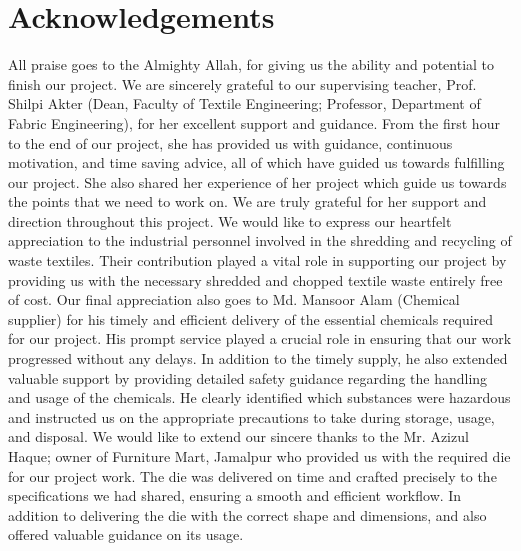 \section*{Acknowledgements}
All praise goes to the Almighty Allah, for giving us the ability and potential to finish 
our project. We are sincerely grateful to our supervising teacher, Prof. Shilpi Akter (Dean, Faculty of Textile Engineering; Professor, Department of Fabric Engineering), for her excellent support and guidance. From the first hour to the end of our project, she has provided us with guidance, continuous motivation, and time saving advice, all of which have guided us towards fulfilling our project. She also shared her experience of her project which guide us towards the points that we need to work on. We are truly grateful for her support and direction throughout this project. We would like to express our heartfelt appreciation to the industrial personnel involved in the shredding and recycling of waste textiles. Their contribution played a vital role in supporting our project by providing us with the necessary shredded and chopped textile waste entirely free of cost. Our final appreciation also goes to Md. Mansoor Alam (Chemical supplier) for his timely and efficient delivery of the essential chemicals required for our project. His prompt service played a crucial role in ensuring that our work progressed without any delays. In addition to the timely supply, he also extended valuable support by providing detailed safety guidance regarding the handling and usage of the chemicals. He clearly identified which substances were hazardous and instructed us on the appropriate precautions to take during storage, usage, and disposal. We would like to extend our sincere thanks to the Mr. Azizul Haque; owner of Furniture Mart, Jamalpur who provided us with the required die for our project work. The die was delivered on time and crafted precisely to the specifications we had shared, ensuring a smooth and efficient workflow. In addition to delivering the die with the correct shape and dimensions, and also offered valuable guidance on its usage.  